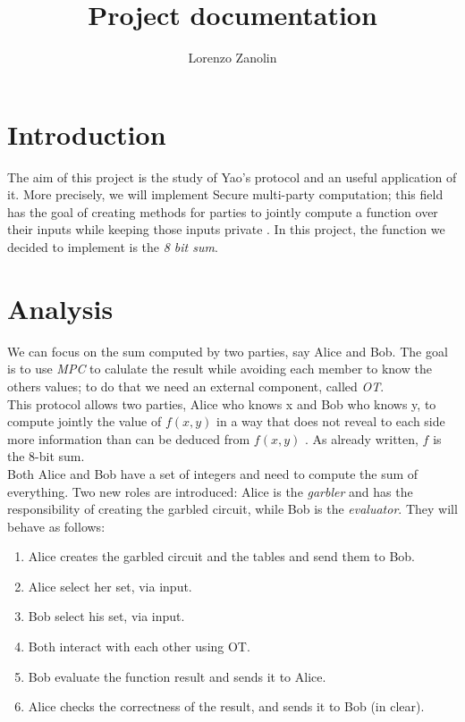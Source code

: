 \documentclass[12pt]{article}
\title{Project documentation}
\author{Lorenzo Zanolin}
\begin{document}
\maketitle

\section{Introduction}
The aim of this project is the study of Yao's protocol \cite{yao} and an useful application of it. More precisely, we will implement Secure multi-party computation; this field has the goal of creating methods for parties to jointly compute a function over their inputs while keeping those inputs private \cite{mpc}. In this project, the function we decided to implement is the \textit{8 bit sum}.

\section{Analysis}
We can focus on the sum computed by two parties, say Alice and Bob. The goal is to use \textit{MPC} to calulate the result while avoiding each member to know the others values; to do that we need an external component, called \textit{OT}.\\ This protocol allows two parties, Alice who
knows x and Bob who knows y, to compute jointly the value of $f(x, y)$ in a way that does not reveal to each side more information than can be deduced from $f(x, y)$ \cite{ot}. As already written, $f$ is the 8-bit sum.\\ Both Alice and Bob have a set of integers and need to compute the sum of everything.
Two new roles are introduced: Alice is the \textit{garbler} and has the responsibility of creating the garbled circuit, while Bob is the \textit{evaluator}.
They will behave as follows:
\begin{enumerate}\label{behaviour}
    \item Alice creates the garbled circuit and the tables and send them to Bob.
    \item Alice select her set, via input.
    \item Bob select his set, via input.
    \item Both interact with each other using OT.
    \item Bob evaluate the function result and sends it to Alice.
    \item Alice checks the correctness of the result, and sends it to Bob (in clear).
\end{enumerate}
\end{document}
